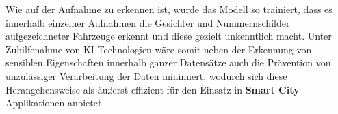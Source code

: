 Wie auf der Aufnahme zu erkennen ist, wurde das Modell so trainiert, dass es innerhalb einzelner Aufnahmen die Gesichter und Nummernschilder aufgezeichneter Fahrzeuge erkennt und diese gezielt unkenntlich macht. 
Unter Zuhilfenahme von KI-Technologien wäre somit neben der Erkennung von sensiblen Eigenschaften innerhalb ganzer Datensätze auch die Prävention von unzulässiger Verarbeitung der Daten minimiert, wodurch sich diese Herangehensweise als äußerst effizient für den Einsatz in \textbf{Smart City} Applikationen anbietet.

